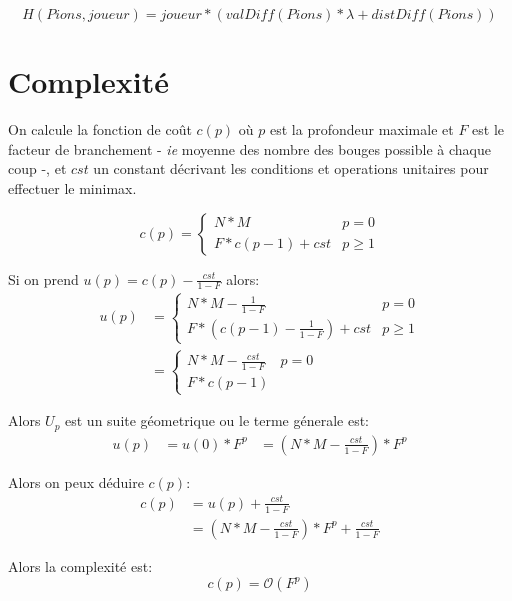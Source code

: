 \documentclass {article}
\begin{document}
\begin{equation*}
   H(Pions, joueur) = joueur * (valDiff(Pions) * \lambda + distDiff(Pions))
\end{equation*}

\section{Complexité}
On calcule la fonction de coût $c(p)$ où $p$ est la profondeur maximale et
$F$ est le facteur de branchement - \textit{ie} moyenne des nombre des bouges
possible à chaque coup -, et $cst$ un constant décrivant les conditions et
operations unitaires pour effectuer le minimax.

\begin{equation*}
   c(p) =
   \begin{cases}
      N * M            &  p = 0 \\
      F * c(p-1) + cst &  p \geq 1
  \end{cases}
\end{equation*}

Si on prend $u(p) = c(p) - \frac{cst}{1-F}$ alors:
\begin{align*}
   u(p) &=
   \begin{cases}
      N*M - \frac{1}{1-F}              & p = 0 \\
      F * (c(p-1) - \frac{1}{1-F}) + cst & p \geq 1
   \end{cases}
\\ 
    &=
   \begin{cases}
      N*M - \frac{cst}{1-F}  & p = 0 \\
      F * c(p-1)
   \end{cases}
\end{align*}

Alors $U_p$ est un suite géometrique ou le terme génerale est:
\begin{align*}
   u(p) &= u(0) * F^p
        &= (N * M - \frac{cst}{1-F}) * F^p
\end{align*}

Alors on peux déduire $c(p)$:
\begin{align*}
   c(p) &= u(p) + \frac{cst}{1-F}\\
        &= (N * M - \frac{cst}{1-F}) * F^p + \frac{cst}{1-F}
\end{align*}

Alors la complexité est:
\begin{equation*}
   c(p) = \mathcal{O}(F^p)
\end{equation*}
\end{document}
